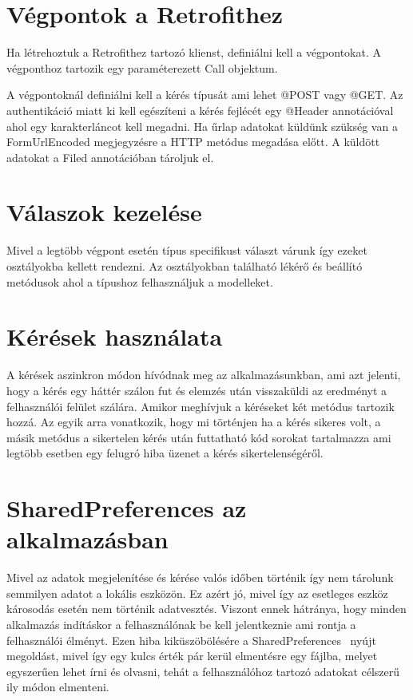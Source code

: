 \documentclass[
]{thesis-ekf}
\theoremstyle{definition}
\theoremstyle{remark}
\begin{document}
	\section{Végpontok a Retrofithez}
	Ha létrehoztuk a Retrofithez tartozó klienst, definiálni kell a végpontokat. A végponthoz tartozik egy paraméterezett Call objektum.
	
	A végpontoknál definiálni kell a kérés típusát ami lehet @POST vagy @GET. Az authentikáció miatt ki kell egészíteni a kérés fejlécét egy @Header annotációval ahol egy karakterláncot kell megadni. Ha űrlap adatokat küldünk szükség van a FormUrlEncoded megjegyzésre a HTTP metódus megadása előtt. A küldött adatokat a Filed annotációban tároljuk el.
	
	\section{Válaszok kezelése}
	Mivel a legtöbb végpont esetén típus specifikust választ várunk így ezeket osztályokba kellett rendezni. Az osztályokban található lékérő és beállító metódusok ahol a típushoz felhasználjuk a modelleket.
	
	\section{Kérések használata}
	A kérések aszinkron módon hívódnak meg az alkalmazásunkban, ami azt jelenti, hogy a kérés egy háttér szálon fut és elemzés után visszaküldi az eredményt a felhasználói felület szálára. Amikor meghívjuk a kéréseket két metódus tartozik hozzá. Az egyik arra vonatkozik, hogy mi történjen ha a kérés sikeres volt, a másik metódus a sikertelen kérés után futtatható kód sorokat tartalmazza ami legtöbb esetben egy felugró hiba üzenet a kérés sikertelenségéről.
	
	\section{SharedPreferences az alkalmazásban}
	Mivel az adatok megjelenítése és kérése valós időben történik így nem tárolunk semmilyen adatot a lokális eszközön. Ez azért jó, mivel így az esetleges eszköz károsodás esetén nem történik adatvesztés. Viszont ennek hátránya, hogy minden alkalmazás indításkor a felhasználónak be kell jelentkeznie ami rontja a felhasználói élményt. Ezen hiba kiküszöbölésére a SharedPreferences~\cite{sharedPref_android} nyújt megoldást, mivel így egy kulcs érték pár kerül elmentésre egy fájlba, melyet egyszerűen lehet írni és olvasni, tehát a felhasználóhoz tartozó adatokat célszerű ily módon elmenteni.
	
\end{document}
